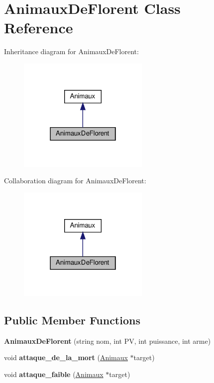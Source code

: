 \hypertarget{classAnimauxDeFlorent}{}\section{Animaux\+De\+Florent Class Reference}
\label{classAnimauxDeFlorent}


Inheritance diagram for Animaux\+De\+Florent\+:
\nopagebreak
\begin{figure}[H]
\begin{center}
\leavevmode
\includegraphics[width=178pt]{classAnimauxDeFlorent__inherit__graph}
\end{center}
\end{figure}


Collaboration diagram for Animaux\+De\+Florent\+:
\nopagebreak
\begin{figure}[H]
\begin{center}
\leavevmode
\includegraphics[width=178pt]{classAnimauxDeFlorent__coll__graph}
\end{center}
\end{figure}
\subsection*{Public Member Functions}
\begin{DoxyCompactItemize}
\item 
\mbox{\label{classAnimauxDeFlorent_ab9388f02bac71adb781ca9d18a63fb79}} 
{\bfseries Animaux\+De\+Florent} (string nom, int PV, int puissance, int arme)
\item 
\mbox{\label{classAnimauxDeFlorent_ae63f1ba7abd46afb2fa8782cd088ece6}} 
void {\bfseries attaque\+\_\+de\+\_\+la\+\_\+mort} (\hyperlink{classAnimaux}{Animaux} $\ast$target)
\item 
\mbox{\label{classAnimauxDeFlorent_a76903cdaaac488dced777b9863f78c55}} 
void {\bfseries attaque\+\_\+faible} (\hyperlink{classAnimaux}{Animaux} $\ast$target)
\end{DoxyCompactItemize}
